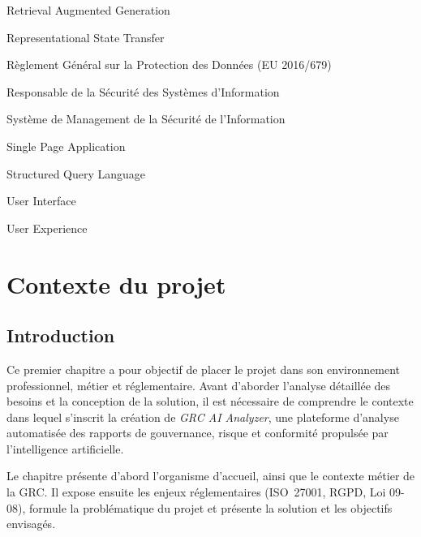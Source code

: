 \documentclass[a4paper,12pt,oneside]{report}
\begin{document}
\begin{description}[leftmargin=2.5cm,style=nextline,itemsep=2pt]
		\item[\textbf{RAG}] Retrieval Augmented Generation
		\item[\textbf{REST}] Representational State Transfer
		\item[\textbf{RGPD}] R\`eglement G\'en\'eral sur la Protection des Donn\'ees (EU 2016/679)
		\item[\textbf{RSSI}] Responsable de la S\'ecurit\'e des Syst\`emes d'Information
		\item[\textbf{SMSI}] Syst\`eme de Management de la S\'ecurit\'e de l'Information
		\item[\textbf{SPA}] Single Page Application
		\item[\textbf{SQL}] Structured Query Language
		\item[\textbf{UI}] User Interface
		\item[\textbf{UX}] User Experience
	\end{description}
	
	\clearpage
	
	\chapter{Contexte du projet}
	
	\section{Introduction}
	Ce premier chapitre a pour objectif de placer le projet dans son environnement professionnel, m\'etier et r\'eglementaire. Avant d'aborder l'analyse d\'etaill\'ee des besoins et la conception de la solution, il est n\'ecessaire de comprendre le contexte dans lequel s'inscrit la cr\'eation de \emph{GRC AI Analyzer}, une plateforme d'analyse automatis\'ee des rapports de gouvernance, risque et conformit\'e propuls\'ee par l'intelligence artificielle.
	
	Le chapitre pr\'esente d'abord l'organisme d'accueil, ainsi que le contexte m\'etier de la GRC. Il expose ensuite les enjeux r\'eglementaires (ISO~27001, RGPD, Loi 09-08), formule la probl\'ematique du projet et pr\'esente la solution et les objectifs envisag\'es.
	
\end{document}
